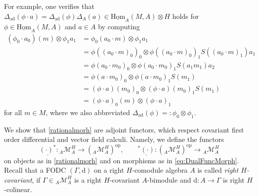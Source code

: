 \documentclass{article}
\theoremstyle{definition}
\begin{document}
	For example, one verifies that $\Delta_\mathrm{ad}(\phi\cdot a)=\Delta_\mathrm{ad}(\phi)\Delta_A(a)\in\underline{\mathrm{Hom}}_A(M,A)\otimes H$ holds for $\phi\in\underline{\mathrm{Hom}}_A(M,A)$ and $a\in A$ by computing
	\begin{align*}
		(\phi_0\cdot a_0)(m)\otimes \phi_1a_1
		&=\phi_0(a_0\cdot m)\otimes\phi_1a_1\\
		&=\phi((a_0\cdot m)_0)_0\otimes\phi((a_0\cdot m)_0)_1S((a_0\cdot m)_1)a_1\\
		&=\phi(a_0\cdot m_0)_0\otimes\phi(a_0\cdot m_0)_1S(a_1m_1)a_2\\
		&=\phi(a\cdot m_0)_0\otimes\phi(a\cdot m_0)_1S(m_1)\\
		&=(\phi\cdot a)(m_0)_0\otimes(\phi\cdot a)(m_0)_1S(m_1)\\
		&=(\phi\cdot a)_0(m)\otimes(\phi\cdot a)_1
	\end{align*}
	for all $m\in M$, where we also abbreviated $\Delta_\mathrm{ad}(\phi)=:\phi_0\otimes\phi_1$.
	
	We show that \eqref{rationalmorh} are adjoint functors, which respect covariant first order differential and vector field calculi.
	Namely, we define the functors 
	\begin{equation}\label{RationalFunctors}
		\underline{(\cdot)^*}\colon{}_A\mathcal{M}_A^H\to({}_A\mathcal{M}_A^H)^\mathrm{op},\qquad
		\underline{{}^*(\cdot)}\colon({}_A\mathcal{M}_A^H)^\mathrm{op}\to{}_A\mathcal{M}_A^H
	\end{equation}
	on objects as in \eqref{rationalmorh} and on morphisms as in \eqref{eq:DualFuncMorph}.
	Recall that a FODC $(\Gamma,\mathrm{d})$ on a right $H$-comodule algebra $A$ is called \textit{right $H$-covariant}, if $\Gamma\in{}_A\mathcal{M}_A^H$ is a right $H$-covariant $A$-bimodule and $\mathrm{d}\colon A\to\Gamma$ is right $H$-colinear. 
	
\end{document}
